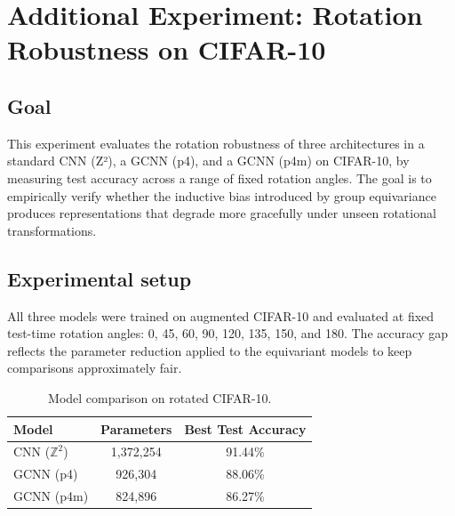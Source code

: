 \documentclass{article}
\begin{document}
\section{Additional Experiment: Rotation Robustness on CIFAR-10}
\subsection{Goal}
This experiment evaluates the rotation robustness of three architectures in a standard CNN (Z²), a GCNN (p4), and a GCNN (p4m) on CIFAR-10, by measuring test accuracy across a range of fixed rotation angles. The goal is to empirically verify whether the inductive bias introduced by group equivariance produces representations that degrade more gracefully under unseen rotational transformations.
\subsection{Experimental setup}
All three models were trained on augmented CIFAR-10 and evaluated at fixed test-time rotation angles: 0\degree, 45\degree, 60\degree, 90\degree, 120\degree, 135\degree, 150\degree, and 180\degree. The accuracy gap reflects the parameter reduction applied to the equivariant models to keep comparisons approximately fair.
\begin{table}[h]
\centering
\caption{Model comparison on rotated CIFAR-10.}
\label{tab:rotation_setup}
\begin{tabular}{lcc}
\toprule
\textbf{Model} & \textbf{Parameters} & \textbf{Best Test Accuracy} \\
\midrule
CNN ($\mathbb{Z}^2$)  & 1{,}372{,}254 & 91.44\% \\
GCNN (p4)             & 926{,}304     & 88.06\% \\
GCNN (p4m)            & 824{,}896     & 86.27\% \\
\bottomrule
\end{tabular}
\end{table}
\end{document}
